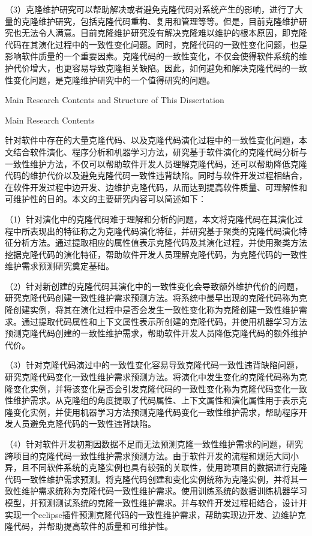 （3）克隆维护研究可以帮助解决或者避免克隆代码对系统产生的影响，进行了大量的克隆维护研究，包括克隆代码重构、复用和管理等等。但是，目前克隆维护研究也无法令人满意。目前克隆维护研究没有解决克隆难以维护的根本原因，即克隆代码在其演化过程中的一致性变化问题。同时，克隆代码的一致性变化问题，也是影响软件质量的一个重要因素。克隆代码的一致性变化，不仅会使得软件系统的维护代价增大，也更容易导致克隆相关缺陷。因此，如何避免和解决克隆代码的一致性变化问题，是克隆维护研究中的一个值得研究的问题。

{Main Research Contents and Structure of This Dissertation}

{Main Research Contents}

针对软件中存在的大量克隆代码、以及克隆代码演化过程中的一致性变化问题，本文结合软件演化、程序分析和机器学习方法，研究基于软件演化的克隆代码分析与一致性维护方法，不仅可以帮助软件开发人员理解克隆代码，还可以帮助降低克隆代码的维护代价以及避免克隆代码一致性违背缺陷。同时与软件开发过程相结合，在软件开发过程中边开发、边维护克隆代码，从而达到提高软件质量、可理解性和可维护性的目的。本文的主要研究内容可以简述如下：

（1）针对演化中的克隆代码难于理解和分析的问题，本文将克隆代码在其演化过程中所表现出的特征称之为克隆代码演化特征，并研究基于聚类的克隆代码演化特征分析方法。通过提取相应的属性值表示克隆代码及其演化过程，并使用聚类方法挖据克隆代码的演化特征，帮助软件开发人员理解克隆代码，为克隆代码的一致性维护需求预测研究奠定基础。

（2）针对新创建的克隆代码其演化中的一致性变化会导致额外维护代价的问题，研究克隆代码创建一致性维护需求预测方法。将系统中最早出现的克隆代码称为克隆创建实例，将其在演化过程中是否会发生一致性变化称为克隆创建一致性维护需求。通过提取代码属性和上下文属性表示所创建的克隆代码，并使用机器学习方法预测克隆代码创建的一致性维护需求，帮助软件开发人员降低克隆代码的额外维护代价。

（3）针对克隆代码演过中的一致性变化容易导致克隆代码一致性违背缺陷问题，研究克隆代码变化一致性维护需求预测方法。将演化中发生变化的克隆代码称为克隆变化实例，并将该变化是否会引发克隆代码的一致性变化称为克隆代码变化一致性维护需求。从克隆组的角度提取了代码属性、上下文属性和演化属性用于表示克隆变化实例，并使用机器学习方法预测克隆代码变化一致性维护需求，帮助程序开发人员避免克隆代码的一致性违背缺陷。

（4）针对软件开发初期因数据不足而无法预测克隆一致性维护需求的问题，研究跨项目的克隆代码一致性维护需求预测方法。由于软件开发的流程和规范大同小异，且不同软件系统的克隆实例也具有较强的关联性，使用跨项目的数据进行克隆代码一致性维护需求预测。将克隆代码创建和变化实例统称为克隆实例，并将其一致性维护需求统称为克隆代码一致性维护需求。使用训练系统的数据训练机器学习模型，并预测测试系统的克隆一致性维护需求。并与软件开发过程相结合，设计并实现一个eclipse插件预测克隆代码的一致性维护需求，帮助实现边开发、边维护克隆代码，并帮助提高软件的质量和可维护性。

